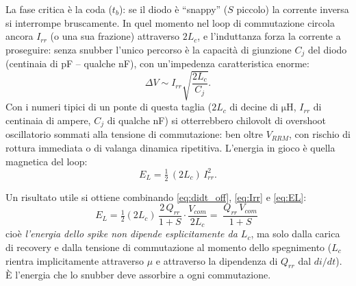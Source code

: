 \documentclass[11pt,a4paper]{article}
\begin{document}
La fase critica \`e la coda ($t_b$): se il diodo \`e ``snappy''
($S$ piccolo) la corrente inversa si interrompe bruscamente. In quel
momento nel loop di commutazione circola ancora $I_{rr}$ (o una sua
frazione) attraverso $2L_c$, e l'induttanza forza la corrente a
proseguire: senza snubber l'unico percorso \`e la capacit\`a di
giunzione $C_j$ del diodo (centinaia di pF -- qualche nF), con
un'impedenza caratteristica enorme:
\begin{equation}
\Delta V \sim I_{rr}\sqrt{\frac{2L_c}{C_j}}.
\end{equation}
Con i numeri tipici di un ponte di questa taglia ($2L_c$ di decine di
$\mathrm{\mu H}$, $I_{rr}$ di centinaia di ampere, $C_j$ di qualche nF) si
otterrebbero chilovolt di overshoot oscillatorio sommati alla tensione di
commutazione: ben oltre $V_{RRM}$, con rischio di rottura immediata o di
valanga dinamica ripetitiva. L'energia in gioco \`e quella magnetica del
loop:
\begin{equation}
E_L = \tfrac{1}{2}\,(2L_c)\,I_{rr}^2.
\label{eq:EL}
\end{equation}

Un risultato utile si ottiene combinando \eqref{eq:didt_off},
\eqref{eq:Irr} e \eqref{eq:EL}:
\begin{equation}
E_L = \tfrac{1}{2}(2L_c)\,\frac{2\,Q_{rr}}{1+S}\cdot\frac{V_{com}}{2L_c}
 = \boxed{\;\frac{Q_{rr}\,V_{com}}{1+S}\;}
\label{eq:EL_elegante}
\end{equation}
cio\`e \emph{l'energia dello spike non dipende esplicitamente da $L_c$},
ma solo dalla carica di recovery e dalla tensione di commutazione al
momento dello spegnimento ($L_c$ rientra implicitamente attraverso $\mu$ e
attraverso la dipendenza di $Q_{rr}$ dal $di/dt$). \`E l'energia che lo
snubber deve assorbire a ogni commutazione.
\end{document}
